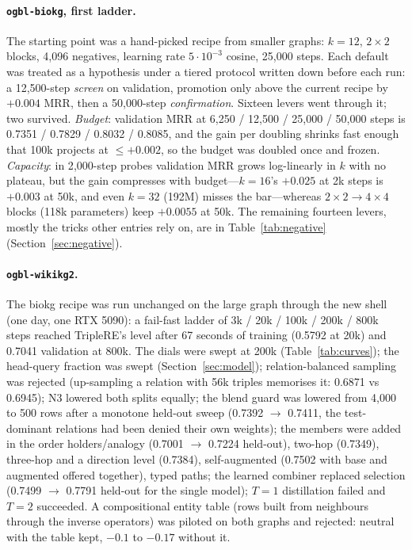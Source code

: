 \documentclass[11pt,a4paper]{article}
\begin{document}
\paragraph{\texttt{ogbl-biokg}, first ladder.}
The starting point was a hand-picked recipe from smaller graphs: $k=12$,
$2\times2$ blocks, 4{,}096 negatives, learning rate $5\cdot10^{-3}$
cosine, 25{,}000 steps. Each default was treated as a hypothesis under a
tiered protocol written down before each run: a 12{,}500-step
\emph{screen} on validation, promotion only above the current recipe by
$+0.004$ MRR, then a 50{,}000-step \emph{confirmation}. Sixteen levers
went through it; two survived. \emph{Budget}: validation MRR at 6{,}250
/ 12{,}500 / 25{,}000 / 50{,}000 steps is 0.7351 / 0.7829 / 0.8032 /
0.8085, and the gain per doubling shrinks fast enough that 100k projects
at $\le+0.002$, so the budget was doubled once and frozen.
\emph{Capacity}: in 2{,}000-step probes validation MRR grows log-linearly
in $k$ with no plateau, but the gain compresses with budget---$k=16$'s
$+0.025$ at 2k steps is $+0.003$ at 50k, and even $k=32$ (192M) misses
the bar---whereas $2\times2\to4\times4$ blocks (118k parameters) keep
$+0.0055$ at 50k. The remaining fourteen levers, mostly the tricks other
entries rely on, are in Table~\ref{tab:negative}
(Section~\ref{sec:negative}).

\paragraph{\texttt{ogbl-wikikg2}.}
The biokg recipe was run unchanged on the large graph through the new
shell (one day, one RTX 5090): a fail-fast ladder of 3k / 20k / 100k /
200k / 800k steps reached TripleRE's level after 67 seconds of training
(0.5792 at 20k) and 0.7041 validation at 800k. The dials were swept at
200k (Table~\ref{tab:curves}); the head-query fraction was swept
(Section~\ref{sec:model}); relation-balanced sampling was rejected
(up-sampling a relation with 56k triples memorises it: 0.6871 vs 0.6945);
N3 lowered both splits equally; the blend guard was lowered from 4{,}000
to 500 rows after a monotone held-out sweep (0.7392 $\to$ 0.7411, the
test-dominant relations had been denied their own weights); the members
were added in the order holders/analogy (0.7001 $\to$ 0.7224 held-out),
two-hop (0.7349), three-hop and a direction level (0.7384), self-augmented
(0.7502 with base and augmented offered together), typed paths; the
learned combiner replaced selection (0.7499 $\to$ 0.7791 held-out for the
single model); $T=1$ distillation failed and $T=2$ succeeded. A
compositional entity table (rows built from neighbours through the
inverse operators) was piloted on both graphs and rejected: neutral with
the table kept, $-0.1$ to $-0.17$ without it.
\end{document}
